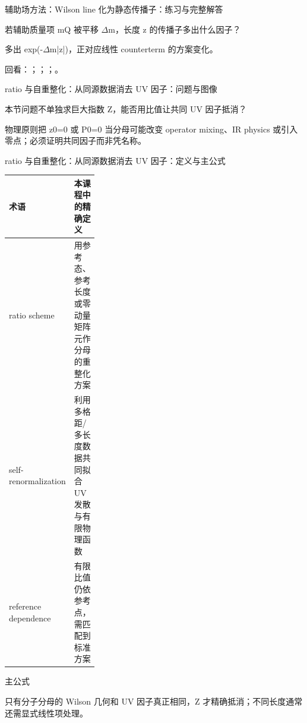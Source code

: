 \begin{frame}[t]{辅助场方法：Wilson line 化为静态传播子：练习与完整解答}
\footnotesize
\begin{block}{}若辅助质量项 mQ 被平移 \ensuremath{\Delta}m，长度 z 的传播子多出什么因子？\end{block}
\begin{exampleblock}{}多出 exp(-\ensuremath{\Delta}m|z|)，正对应线性 counterterm 的方案变化。\end{exampleblock}
\vfill
\scriptsize 回看：；；；。
\end{frame}

\begin{frame}[t]{ratio 与自重整化：从同源数据消去 UV 因子：问题与图像}
\footnotesize
\begin{block}{本节问题}不单独求巨大指数 Z，能否用比值让共同 UV 因子抵消？\end{block}
\begin{block}{物理原则}\quad 把 z0=0 或 P0=0 当分母可能改变 operator mixing、IR physics 或引入零点；必须证明共同因子而非凭名称。\end{block}
\end{frame}

\begin{frame}[t]{ratio 与自重整化：从同源数据消去 UV 因子：定义与主公式}
\footnotesize\begin{tabularx}{\linewidth}{p{0.30\linewidth}Y}
\toprule 术语 & 本课程中的精确定义\\\midrule
{} ratio scheme & 用参考态、参考长度或零动量矩阵元作分母的重整化方案\\
 self-renormalization & 利用多格距/\allowbreak{}多长度数据共同拟合 UV 发散与有限物理函数\\
 reference dependence & 有限比值仍依参考点，需匹配到标准方案\\
\bottomrule\end{tabularx}\vspace{0.15cm}
\begin{block}{ 主公式}\centering{}\end{block}
只有分子分母的 Wilson 几何和 UV 因子真正相同，Z 才精确抵消；不同长度通常还需显式线性项处理。
\end{frame}

